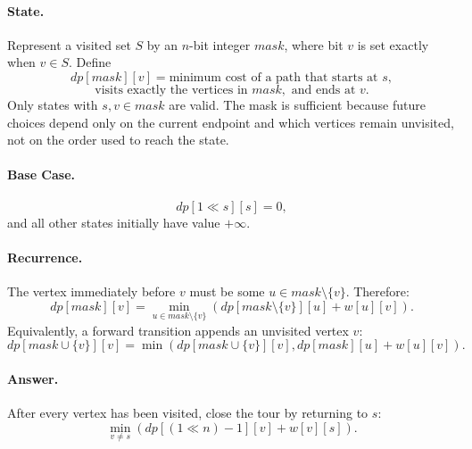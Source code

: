 \documentclass[9pt]{extarticle}
\begin{document}
\paragraph{State.}
Represent a visited set \(S\) by an \(n\)-bit integer \(\textit{mask}\), where
bit \(v\) is set exactly when \(v\in S\). Define
\[
dp[\textit{mask}][v]
  = \text{minimum cost of a path that starts at }s,
\]
\[
\text{visits exactly the vertices in }\textit{mask},
\text{ and ends at }v.
\]
Only states with \(s,v\in\textit{mask}\) are valid. The mask is sufficient
because future choices depend only on the current endpoint and which vertices
remain unvisited, not on the order used to reach the state.

\paragraph{Base Case.}
\[
dp[1\ll s][s]=0,
\]
and all other states initially have value \(+\infty\).

\paragraph{Recurrence.}
The vertex immediately before \(v\) must be some
\(u\in\textit{mask}\setminus\{v\}\). Therefore:
\[
\boxed{
dp[\textit{mask}][v]
  = \min_{u\in\textit{mask}\setminus\{v\}}
      \left(
      dp[\textit{mask}\setminus\{v\}][u] + w[u][v]
      \right).
}
\]
Equivalently, a forward transition appends an unvisited vertex \(v\):
\[
dp[\textit{mask}\cup\{v\}][v]
  = \min\left(
      dp[\textit{mask}\cup\{v\}][v],
      dp[\textit{mask}][u]+w[u][v]
    \right).
\]

\paragraph{Answer.}
After every vertex has been visited, close the tour by returning to \(s\):
\[
\boxed{
\min_{v\ne s}
  \left(dp[(1\ll n)-1][v]+w[v][s]\right).
}
\]
\end{document}
